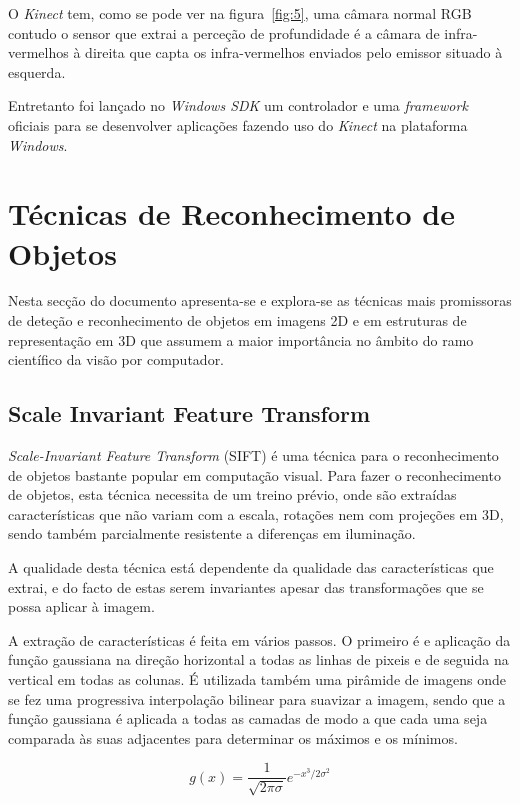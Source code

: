 O \emph{Kinect} tem, como se pode ver na figura~\ref{fig:5}, uma câmara normal RGB 
contudo o sensor que extrai a perceção de profundidade é a câmara de infra-vermelhos à direita
que capta os infra-vermelhos enviados pelo emissor situado à esquerda.

Entretanto foi lançado no \emph{Windows SDK} um controlador e uma \emph{framework} oficiais para se desenvolver aplicações fazendo uso do \emph{Kinect} na plataforma \emph{Windows}.


\section{Técnicas de Reconhecimento de Objetos}\label{objdetect}

Nesta secção do documento apresenta-se e explora-se as técnicas mais
promissoras de deteção e reconhecimento de objetos em imagens 2D e
em estruturas de representação em 3D que assumem a maior importância 
no âmbito do ramo científico da visão por computador.

\subsection[SIFT]{Scale Invariant Feature Transform}\label{sift}

\emph{Scale-Invariant Feature Transform} (SIFT) \cite{Lowe:1999:ORL:850924.851523} é uma técnica para o reconhecimento de objetos bastante popular em computação visual. Para fazer o reconhecimento de objetos, esta técnica necessita de um treino prévio, onde são extraídas características que não variam com a escala, rotações nem com projeções em 3D, sendo também parcialmente resistente a diferenças em iluminação.

A qualidade desta técnica está dependente da qualidade das características que extrai, e do facto de estas serem invariantes apesar das transformações que se possa aplicar à imagem.

A extração de características é feita em vários passos. O primeiro é e
aplicação da função gaussiana na direção horizontal a todas as linhas de pixeis
 e de seguida na vertical em todas as colunas.
É utilizada também uma pirâmide de imagens onde se fez uma progressiva interpolação bilinear para suavizar a imagem, sendo que  a função gaussiana é aplicada a
todas as camadas de modo a que cada uma seja comparada às suas adjacentes
para determinar os máximos e os mínimos.

\[
g(x) = \frac{1}{\sqrt{2\pi\sigma}}e^{-x^3 / 2 \sigma^2}
\]

